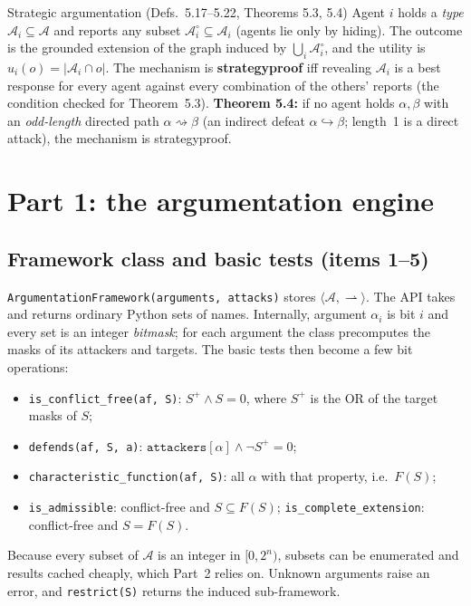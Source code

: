 \documentclass[10pt,a4paper]{article}
\newcommand{\code}[1]{\textcolor{brand!85!black}{\texttt{#1}}}
\newcommand{\att}{\rightharpoonup}          %
\newcommand{\AF}{\langle\mathcal{A},\att\rangle}
\newcommand{\Args}{\mathcal{A}}
\newcommand{\idef}{\hookrightarrow}         %
\begin{document}
\begin{defbox}{Strategic argumentation (Defs.~5.17--5.22, Theorems 5.3, 5.4)}
Agent $i$ holds a \emph{type} $\Args_i\subseteq\Args$ and reports any subset $\Args^\circ_i\subseteq\Args_i$ (agents lie only by
hiding). The outcome is the grounded extension of the graph induced by $\bigcup_i\Args^\circ_i$, and the utility is
$u_i(o)=|\Args_i\cap o|$. The mechanism is \textbf{strategyproof} iff revealing $\Args_i$ is a best response for every agent
against every combination of the others' reports (the condition checked for Theorem~5.3).
\textbf{Theorem 5.4:} if no agent holds $\alpha,\beta$ with an \emph{odd-length} directed path $\alpha\rightsquigarrow\beta$
(an indirect defeat $\alpha\idef\beta$; length~1 is a direct attack), the mechanism is strategyproof.
\end{defbox}

\section{Part 1: the argumentation engine}\label{sec:part1}

\subsection{Framework class and basic tests (items 1--5)}\label{sec:engine}

\code{ArgumentationFramework(arguments, attacks)} stores $\AF$. The API takes and returns ordinary Python sets of names.
Internally, argument $\alpha_i$ is bit $i$ and every set is an integer \emph{bitmask}; for each argument the class
precomputes the masks of its attackers and targets. The basic tests then become a few bit operations:
\begin{itemize}
  \item \code{is\_conflict\_free(af, S)}: $S^+\wedge S=0$, where $S^+$ is the OR of the target masks of $S$;
  \item \code{defends(af, S, a)}: $\texttt{attackers}[\alpha]\wedge\neg S^+=0$;
  \item \code{characteristic\_function(af, S)}: all $\alpha$ with that property, i.e.\ $F(S)$;
  \item \code{is\_admissible}: conflict-free and $S\subseteq F(S)$; \code{is\_complete\_extension}: conflict-free and $S=F(S)$.
\end{itemize}
Because every subset of $\Args$ is an integer in $[0,2^n)$, subsets can be enumerated and results cached cheaply, which
Part~2 relies on. Unknown arguments raise an error, and \code{restrict(S)} returns the induced sub-framework.
\end{document}
